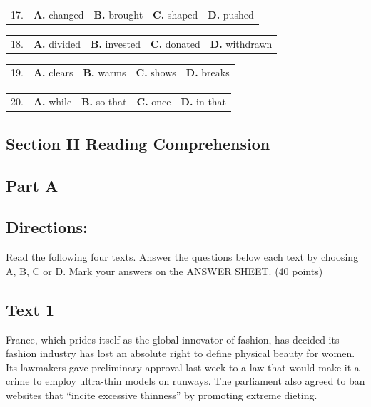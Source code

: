 \documentclass[UTF8,11pt]{ctexart}
\begin{document}
\noindent\begin{tabularx}{\linewidth}{@{}lXXXX@{}}17. & \textbf{A.} changed & \textbf{B.} brought & \textbf{C.} shaped & \textbf{D.} pushed\\\end{tabularx}\par

\noindent\begin{tabularx}{\linewidth}{@{}lXXXX@{}}18. & \textbf{A.} divided & \textbf{B.} invested & \textbf{C.} donated & \textbf{D.} withdrawn\\\end{tabularx}\par

\noindent\begin{tabularx}{\linewidth}{@{}lXXXX@{}}19. & \textbf{A.} clears & \textbf{B.} warms & \textbf{C.} shows & \textbf{D.} breaks\\\end{tabularx}\par

\noindent\begin{tabularx}{\linewidth}{@{}lXXXX@{}}20. & \textbf{A.} while & \textbf{B.} so that & \textbf{C.} once & \textbf{D.} in that\\\end{tabularx}\par

\subsection*{\textbf{Section II Reading Comprehension}}


\subsection*{\textbf{Part A}}


\subsection*{\textbf{Directions:}}


Read the following four texts. Answer the questions below each text by choosing A, B, C or D. Mark your answers on the ANSWER SHEET. (40 points)


\subsection*{\textbf{Text 1}}


France, which prides itself as the global innovator of fashion, has decided its fashion industry has lost an absolute right to define physical beauty for women. Its lawmakers gave preliminary approval last week to a law that would make it a crime to employ ultra-thin models on runways. The parliament also agreed to ban websites that “incite excessive thinness” by promoting extreme dieting.
\end{document}
